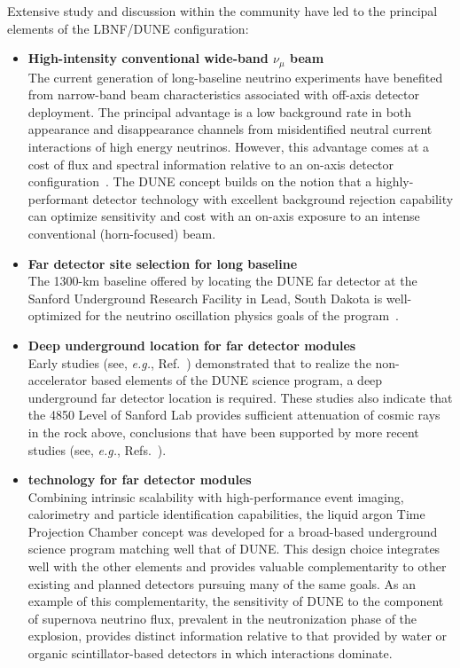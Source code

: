 Extensive study and discussion within the community
have led to the principal elements of the LBNF/DUNE
configuration:
\begin{itemize}
  \item {\bf\boldmath High-intensity conventional wide-band
  $\nu_\mu$ beam}\\
	The current generation of long-baseline neutrino experiments
	have benefited from narrow-band beam characteristics 
	associated with off-axis detector deployment. The principal advantage is a low background rate in both \nue appearance 
	and \numu disappearance channels from misidentified neutral current interactions of high energy neutrinos.  
	However, this advantage comes at a cost of flux and 
	spectral information relative to an on-axis detector 
    configuration~\cite{Adams:2013qkq,Agarwalla:2014tca}.
    The DUNE concept
    builds on the notion that a highly-performant detector
    technology with excellent background rejection capability can
    optimize sensitivity and cost with an on-axis exposure to
    an intense conventional (horn-focused) beam.

  \item {\bf Far detector site selection for long baseline}\\
    The 1300-km baseline offered by locating the DUNE far detector
    at the Sanford Underground Research Facility in Lead, 
    South Dakota is well-optimized for the neutrino oscillation 
    physics goals of the program~\cite{Bass:2013vcg}.

  \item {\bf Deep underground location for far detector modules}\\
    Early studies (see, {\sl e.g.}, Ref.~\cite{homestake:depth}) 
    demonstrated that to realize the non-accelerator based elements
    of the DUNE science program, a deep underground far detector
    location is required.  These studies also indicate that the 
    4850 Level of Sanford Lab provides sufficient attenuation of 
    cosmic rays in the rock above, conclusions that have been 
    supported by more recent studies (see,
    {\sl e.g.}, Refs.~\cite{bib:docdb3384,bib:docdb1752}).

  \item {\bf \lartpc technology for far detector modules}\\
    Combining intrinsic scalability with high-performance event 
    imaging, calorimetry and particle identification capabilities, 
    the liquid argon Time Projection Chamber concept was developed 
    for a broad-based underground science program matching well 
    that of DUNE.  This design choice integrates well with the
    other elements and provides valuable complementarity to other 
    existing and planned detectors pursuing many
    of the same goals.  As an example of this complementarity,
    the sensitivity of DUNE to the \nue component of supernova 
    neutrino flux, prevalent in the neutronization phase of the 
    explosion, provides distinct information relative to that 
    provided by water or organic scintillator-based detectors in 
    which \anue interactions dominate.
\end{itemize}

